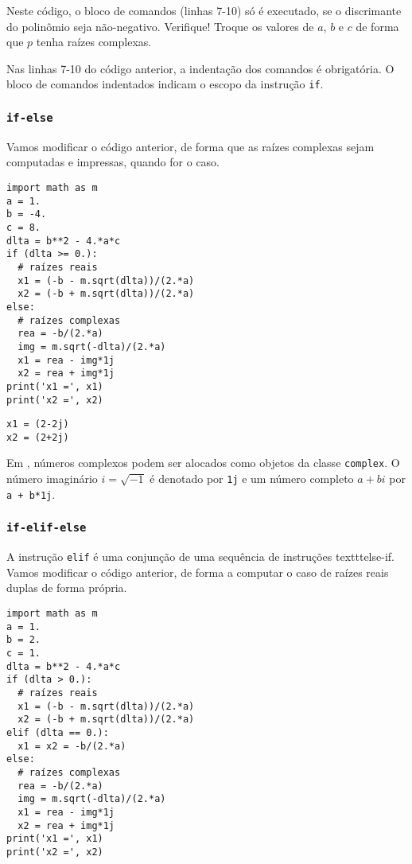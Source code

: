 Neste código, o bloco de comandos (linhas 7-10) só é executado, se o discrimante do polinômio seja não-negativo. Verifique! Troque os valores de $a$, $b$ e $c$ de forma que $p$ tenha raízes complexas.

\begin{obs}
  Nas linhas 7-10 do código anterior, a indentação dos comandos é obrigatória. O bloco de comandos indentados indicam o escopo da instrução \texttt{if}.
\end{obs}

\subsubsection{\texttt{if-else}}

Vamos modificar o código anterior, de forma que as raízes complexas sejam computadas e impressas, quando for o caso.

\begin{lstlisting}
import math as m
a = 1.
b = -4.
c = 8.
dlta = b**2 - 4.*a*c
if (dlta >= 0.):
  # raízes reais
  x1 = (-b - m.sqrt(dlta))/(2.*a)
  x2 = (-b + m.sqrt(dlta))/(2.*a)
else:
  # raízes complexas
  rea = -b/(2.*a)
  img = m.sqrt(-dlta)/(2.*a)
  x1 = rea - img*1j
  x2 = rea + img*1j
print('x1 =', x1)
print('x2 =', x2)
\end{lstlisting}

\begin{verbatim}
x1 = (2-2j)
x2 = (2+2j)
\end{verbatim}

\begin{obs}
  Em {\python}, números complexos podem ser alocados como objetos da classe \texttt{complex}. O número imaginário $i = \sqrt{-1}$ é denotado por \texttt{1j} e um número completo $a + bi$ por \texttt{a + b*1j}.
\end{obs}

\subsubsection{\texttt{if-elif-else}}

A instrução \texttt{elif} é uma conjunção de uma sequência de instruções texttt{else-if}. Vamos modificar o código anterior, de forma a computar o caso de raízes reais duplas de forma própria.

\begin{lstlisting}
import math as m
a = 1.
b = 2.
c = 1.
dlta = b**2 - 4.*a*c
if (dlta > 0.):
  # raízes reais
  x1 = (-b - m.sqrt(dlta))/(2.*a)
  x2 = (-b + m.sqrt(dlta))/(2.*a)
elif (dlta == 0.):
  x1 = x2 = -b/(2.*a)
else:
  # raízes complexas
  rea = -b/(2.*a)
  img = m.sqrt(-dlta)/(2.*a)
  x1 = rea - img*1j
  x2 = rea + img*1j
print('x1 =', x1)
print('x2 =', x2)
\end{lstlisting}

